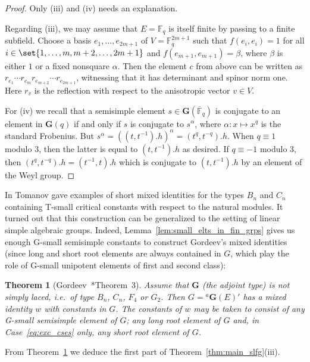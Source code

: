 \documentclass[a4paper,12pt]{amsproc}
\theoremstyle{plain}
\newtheorem{theorem}[definition]{Theorem}
\theoremstyle{definition}
\begin{document}
\begin{proof}
Only (iii) and (iv) needs an explanation.

Regarding (iii), we may assume that $E=\mathbb{F}_q$ is itself finite by passing to a finite subfield. Choose a basis $e_1,\ldots,e_{2m+1}$ of $V=\mathbb{F}_q^{2m+1}$ such that $f(e_i,e_i)=1$ for all $i\in\set{1,\ldots,m,m+2,\ldots,2m+1}$ and $f(e_{m+1},e_{m+1})=\beta$, where $\beta$ is either $1$ or a fixed nonsquare $\alpha$. Then the element $c$ from above can be written as $r_{e_1}\cdots r_{e_m} r_{e_{m+2}}\cdots r_{e_{2m+1}}$, witnessing that it has determinant and spinor norm one. Here $r_v$ is the reflection with respect to the anisotropic vector $v\in V$.

For (iv) we recall that a semisimple element $s\in\mathbf{G}(\overline{\mathbb{F}}_q)$ is conjugate to an element in $\mathbf{G}(q)$ if and only if $s$ is conjugate to $s^\alpha$, where $\alpha\colon x\mapsto x^q$ is the standard Frobenius. But $s^\alpha=((t,t^{-1}).h)^\alpha=(t^q,t^{-q}).h$.
When $q\equiv 1$ modulo $3$, then the latter is equal to $(t,t^{-1}).h$ as desired.
If $q\equiv -1$ modulo $3$, then $(t^q,t^{-q}).h=(t^{-1},t).h$ which is conjugate to $(t,t^{-1}).h$ by an element of the Weyl group.
\end{proof}

In \cite{tomanov1985generalized} Tomanov gave examples of short mixed identities for the types $B_n$ and $C_n$ containing T-small critical constants with respect to the natural modules. It turned out that this construction can be generalized to the setting of linear simple algebraic groups. Indeed, Lemma~\ref{lem:small_elts_in_fin_grps} gives us enough G-small semisimple constants to construct Gordeev's mixed identities (since long and short root elements are always contained in $G$, which play the role of G-small unipotent elements of first and second class):
	
\begin{theorem}[Gordeev~\cite{gordeev1997freedom}*{Theorem~3}]\label{thm:gordeev_short_ids}
Assume that $\mathbf{G}$ (the adjoint type) is not simply laced, i.e.\ of type $B_n$, $C_n$, $F_4$ or $G_2$.
Then $G={}^a\mathbf{G}(E)'$ has a mixed identity $w$ with constants in $G$. The constants of $w$ may be taken to consist of \emph{any} G-small 
semisimple element of $G$; any long root element of $G$ 
and, in Case~\eqref{eq:exc_cses} only, any short root element of $G$.
\end{theorem}
	
From Theorem~\ref{thm:gordeev_short_ids} we deduce the first part of Theorem~\ref{thm:main_slfg}(iii).
\end{document}
